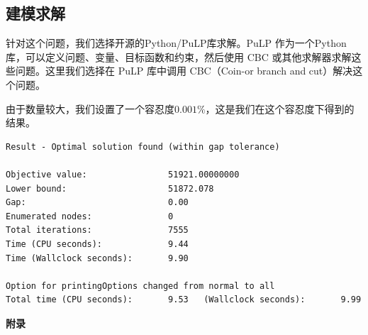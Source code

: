 \documentclass[UTF8,a4paper,10 pt]{article}%
\begin{document}
\subsection{建模求解}
针对这个问题，我们选择开源的Python/PuLP库求解。PuLP 作为一个Python库，可以定义问题、变量、目标函数和约束，然后使用 CBC 或其他求解器求解这些问题。这里我们选择在 PuLP 库中调用 CBC（Coin-or branch and cut）解决这个问题。

由于数量较大，我们设置了一个容忍度\(0.001\%\)，这是我们在这个容忍度下得到的结果。
\begin{lstlisting}
Result - Optimal solution found (within gap tolerance)

Objective value:                51921.00000000
Lower bound:                    51872.078
Gap:                            0.00
Enumerated nodes:               0
Total iterations:               7555
Time (CPU seconds):             9.44
Time (Wallclock seconds):       9.90

Option for printingOptions changed from normal to all
Total time (CPU seconds):       9.53   (Wallclock seconds):       9.99
\end{lstlisting}










\clearpage
\begin{center}
    \huge \bf 附录
\end{center}
\appendix
\end{document}
